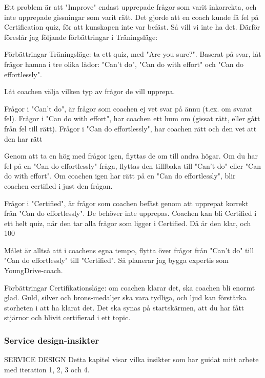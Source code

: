 Ett problem är att "Improve" endast upprepade frågor som varit inkorrekta, och inte upprepade gissningar som varit rätt. Det gjorde att en coach kunde få fel på Certification quiz, för att kunskapen inte var befäst. Så vill vi inte ha det. Därför föreslår jag följande förbättringar i Träningsläge:

Förbättringar Träningsläge: ta ett quiz, med "Are you sure?". Baserat på svar, låt frågor hamna i tre olika lådor: "Can't do", "Can do with effort" och "Can do effortlessly".

Låt coachen välja vilken typ av frågor de vill upprepa. 

Frågor i "Can't do", är frågor som coachen ej vet svar på ännu (t.ex. om svarat fel). 
Frågor i "Can do with effort", har coachen ett hum om (gissat rätt, eller gått från fel till rätt). 
Frågor i "Can do effortlessly", har coachen rätt och den vet att den har rätt

Genom att ta en hög med frågor igen, flyttas de om till andra högar. Om du har fel på en "Can do effortlessly"-fråga, flyttas den tilllbaka till "Can't do" eller "Can do with effort". Om coachen igen har rätt på en "Can do effortlessly", blir coachen certified i just den frågan.

Frågor i "Certified", är frågor som coachen befäst genom att upprepat korrekt från "Can do effortlessly". De behöver inte upprepas. Coachen kan bli Certified i ett helt quiz, när den tar alla frågor som ligger i Certified. Då är den klar, och 100%

Målet är alltså att i coachens egna tempo, flytta över frågor från "Can't do" till "Can do effortlessly" till "Certified". Så planerar jag bygga expertis som YoungDrive-coach.

Förbättringar Certifikationsläge: om coachen klarar det, ska coachen bli enormt glad. Guld, silver och brons-medaljer ska vara tydliga, och ljud kan förstärka storheten i att ha klarat det. Det ska synas på startskärmen, att du har fått stjärnor och blivit certifierad i ett topic.

\subsubsection{Service design-insikter}

SERVICE DESIGN
Detta kapitel visar vilka insikter som har guidat mitt arbete med iteration 1, 2, 3 och 4.

